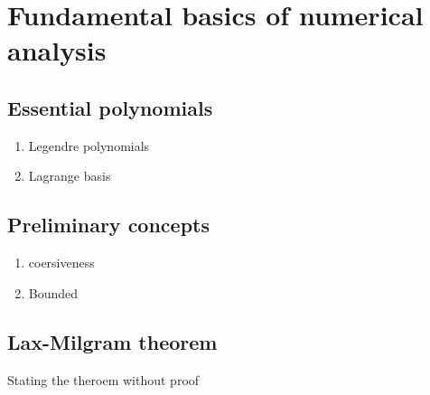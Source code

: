 
\chapter{Fundamental basics of numerical analysis} %

\label{AppendixA} %


\section{Essential polynomials}
\begin{enumerate}
    \item Legendre polynomials
    \item Lagrange basis 
\end{enumerate}

\section{Preliminary concepts}

\begin{enumerate}
    \item coersiveness
    \item Bounded  
\end{enumerate}

\section{Lax-Milgram theorem}

Stating the theroem without proof 

